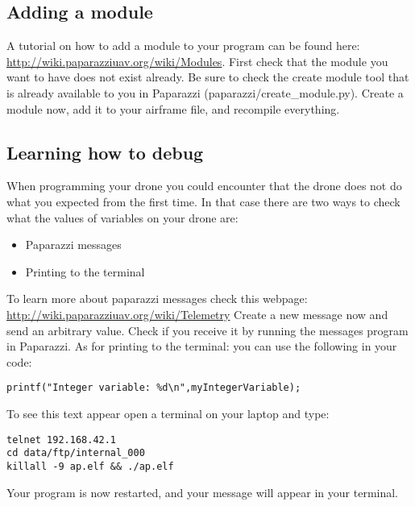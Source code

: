 \documentclass{article}
\begin{document}
\subsection*{Adding a module}
A tutorial on how to add a module to your program can be found here: \url{http://wiki.paparazziuav.org/wiki/Modules}.
First check that the module you want to have does not exist already. Be sure to check the create module tool that is already available to you in Paparazzi (paparazzi/create\_module.py). 
Create a module now, add it to your airframe file, and recompile everything. 

\subsection*{Learning how to debug}
When programming your drone you could encounter that the drone does not do what you expected from the first time. In that case there are two ways to check what the values of variables on your drone are:
\begin{itemize}
	\item Paparazzi messages
	\item Printing to the terminal
\end{itemize}
To learn more about paparazzi messages check this webpage: \url{http://wiki.paparazziuav.org/wiki/Telemetry}
Create a new message now and send an arbitrary value. Check if you receive it by running the messages program in Paparazzi. 
As for printing to the terminal: you can use the following in your code:

\begin{verbatim}
printf("Integer variable: %d\n",myIntegerVariable);
\end{verbatim}
To see this text appear open a terminal on your laptop and type:
\begin{verbatim}
telnet 192.168.42.1
cd data/ftp/internal_000
killall -9 ap.elf && ./ap.elf
\end{verbatim}
Your program is now restarted, and your message will appear in your terminal. 
\end{document}
